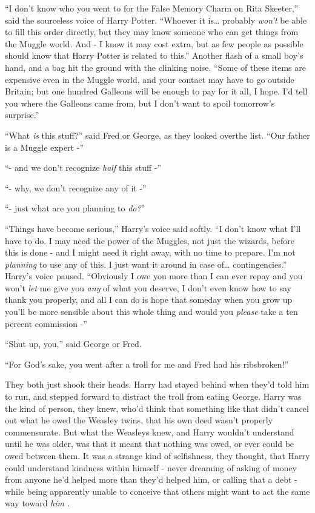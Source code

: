 ``I don't know who you went to for the False Memory Charm on Rita Skeeter,'' said the sourceless voice of Harry Potter. ``Whoever it is\ldots{} probably \emph{won't} be able to fill this order directly, but they may know someone who can get things from the Muggle world. And - I know it may cost extra, but as few people as possible should know that Harry Potter is related to this.'' Another flash of a small boy's hand, and a bag hit the ground with the clinking noise. ``Some of these items are expensive even in the Muggle world, and your contact may have to go outside Britain; but one hundred Galleons will be enough to pay for it all, I hope. I'd tell you where the Galleons came from, but I don't want to spoil tomorrow's surprise.''

``What \emph{is} this stuff?'' said Fred or George, as they looked overthe list. ``Our father is a Muggle expert -''

``- and we don't recognize \emph{half} this stuff -''

``- why, we don't recognize any of it -''

``- just what are you planning to \emph{do?}''

``Things have become serious,'' Harry's voice said softly. ``I don't know what I'll have to do. I may need the power of the Muggles, not just the wizards, before this is done - and I might need it right away, with no time to prepare. I'm not \emph{planning} to use any of this. I just want it around in case of\ldots{} contingencies.'' Harry's voice paused. ``Obviously I owe you more than I can ever repay and you won't \emph{let} me give you \emph{any} of what you deserve, I don't even know how to say thank you properly, and all I can do is hope that someday when you grow up you'll be more sensible about this whole thing and would you \emph{please} take a ten percent commission -''

``Shut up, you,'' said George or Fred.

``For God's sake, you went after a troll for me and Fred had his ribsbroken!''

They both just shook their heads. Harry had stayed behind when they'd told him to run, and stepped forward to distract the troll from eating George. Harry was the kind of person, they knew, who'd think that something like that didn't cancel out what he owed the Weasley twins, that his own deed wasn't properly commensurate. But what the Weasleys knew, and Harry wouldn't understand until he was older, was that it meant that nothing was owed, or ever could be owed between them. It was a strange kind of selfishness, they thought, that Harry could understand kindness within himself - never dreaming of asking of money from anyone he'd helped more than they'd helped him, or calling that a debt - while being apparently unable to conceive that others might want to act the same way toward \emph{him} .

